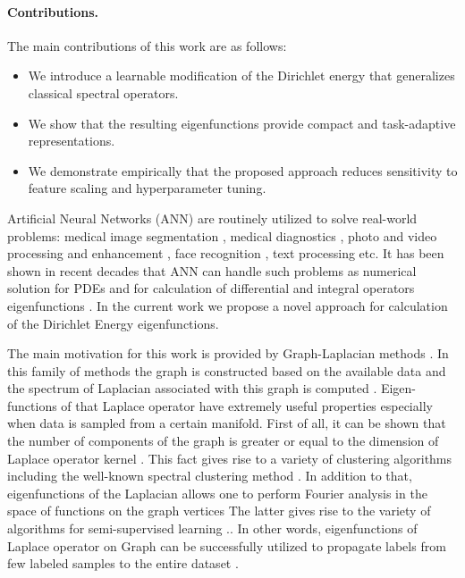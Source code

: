 \documentclass{article}
\theoremstyle{plain}
\theoremstyle{definition}
\theoremstyle{remark}
\begin{document}
\paragraph{Contributions.}
The main contributions of this work are as follows:
\begin{itemize}
\item We introduce a learnable modification of the Dirichlet energy that generalizes classical spectral operators.
\item We show that the resulting eigenfunctions provide compact and task-adaptive representations.
\item We demonstrate empirically that the proposed approach reduces sensitivity to feature scaling and hyperparameter tuning.
\end{itemize}

\label{sec:introduction}
Artificial Neural Networks (ANN) \citet{rosenblatt1958perceptron} are routinely utilized to solve real-world problems:
medical image segmentation \citet{ajmal2018convolutional}, 
medical diagnostics \citet{amato2013artificial}, photo and video processing and enhancement \citet{ahmadi2016unsupervised},
face recognition \citet{le2011applying}, text processing \citet{chang2023survey} etc.
It has been shown in recent decades that ANN can handle such problems as numerical solution for PDEs
and for calculation of differential and integral operators eigenfunctions \citet{Jin2020UnsupervisedNN}.
In the current work we propose a novel approach for calculation of the Dirichlet Energy \citet{evans2022partial} eigenfunctions.


The main motivation for this work is provided by Graph-Laplacian methods \citet{4476091}.
In this family of methods the graph is constructed based on the available data and
the spectrum of Laplacian associated with this graph is computed \citet{10.1137/1.9781611972801.49}.
Eigen-functions of that Laplace operator have extremely useful properties especially when data is sampled from a certain manifold.
First of all, it can be shown that the number of components of the graph 
is greater or equal to the dimension of Laplace operator kernel \citet{BELKIN20081289}.
This fact gives rise to a variety of clustering algorithms 
including the well-known spectral clustering method \citet{NIPS2001_801272ee}.
In addition to that, eigenfunctions of the Laplacian allows one to perform Fourier analysis
in the space of functions on the graph vertices \citet{kostopoulos2018semi}
The latter gives rise to the variety of algorithms for semi-supervised learning \citet{sheikhpour2018semi}..
In other words, eigenfunctions of Laplace operator on Graph can be successfully utilized to propagate labels from few labeled samples
to the entire dataset \citet{646eb8ee0f50464f8db1e953d2df93c3}.
\end{document}
